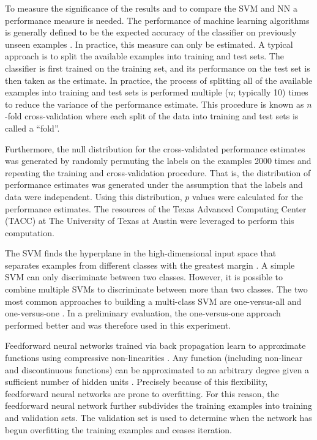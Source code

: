 \documentclass[review,1p,authoryear]{elsarticle}
\begin{document}
To measure the significance of the results and to compare the SVM and NN a performance measure is needed.
The performance of machine learning algorithms is generally defined to be the expected accuracy of the classifier on previously unseen examples \citep{Bishop2006}.
In practice, this measure can only be estimated.
A typical approach is to split the available examples into training and test sets.
The classifier is first trained on the training set, and its performance on the test set is then taken as the estimate.
In practice, the process of splitting all of the available examples into training and test sets is performed multiple ($n$; typically 10) times to reduce the variance of the performance estimate.
This procedure is known as $n$-fold cross-validation \citep{Kohavi1995} where each split of the data into training and test sets is called a ``fold''.

Furthermore, the null distribution for the cross-validated performance estimates was generated by randomly permuting the labels on the examples 2000 times and repeating the training and cross-validation procedure.
That is, the distribution of performance estimates was generated under the assumption that the labels and data were independent.
Using this distribution, $p$ values were calculated for the performance estimates.
The resources of the Texas Advanced Computing Center (TACC) at The University of Texas at Austin were leveraged to perform this computation.

The SVM finds the hyperplane in the high-dimensional input space that separates examples from different classes with the greatest margin \citep{Cortes1995}.
A simple SVM can only discriminate between two classes.
However, it is possible to combine multiple SVMs to discriminate between more than two classes.
The two most common approaches to building a multi-class SVM are one-versus-all and one-versus-one \citep{Weston1999}.
In a preliminary evaluation, the one-versus-one approach performed better and was therefore used in this experiment.

Feedforward neural networks trained via back propagation learn to approximate functions using compressive non-linearities \citep{Hagan1994}.
Any function (including non-linear and discontinuous functions) can be approximated to an arbitrary degree given a sufficient number of hidden units \citep{Hornik1989}.
Precisely because of this flexibility, feedforward neural networks are prone to overfitting.
For this reason, the feedforward neural network further subdivides the training examples into training and validation sets.
The validation set is used to determine when the network has begun overfitting the training examples and ceases iteration.
\end{document}
